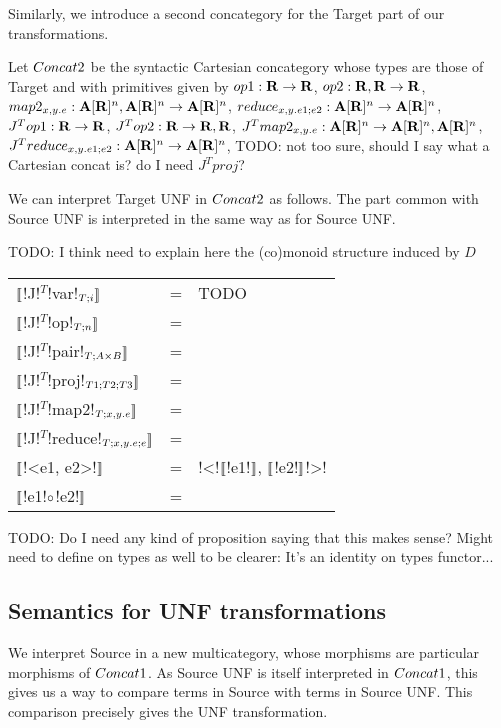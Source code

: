 Similarly, we introduce a second concategory for the Target part of our transformations.

\begin{definition}[$\ConcatT$]
Let $\ConcatT$ be the syntactic Cartesian concategory whose types are those of Target and 
with primitives given by 
$op1: \mathbf{R} \to \mathbf{R}$, 
$op2: \mathbf{R},\mathbf{R} \to \mathbf{R}$, 
$map2_{x,y.e}: \mathbf{A}[\mathbf{R}]^{n},\mathbf{A}[\mathbf{R}]^{n}\to \mathbf{A}[\mathbf{R}]^{n}$, 
$reduce_{x,y.e1;e2}: \mathbf{A}[\mathbf{R}]^{n} \to \mathbf{A}[\mathbf{R}]^{n}$, 
$J^Top1: \mathbf{R} \to \mathbf{R}$, 
$J^Top2: \mathbf{R} \to \mathbf{R}, \mathbf{R}$, 
$J^Tmap2_{x,y.e}: \mathbf{A}[\mathbf{R}]^{n} \to \mathbf{A}[\mathbf{R}]^{n}, \mathbf{A}[\mathbf{R}]^{n}$, 
$J^Treduce_{x,y.e1;e2}: \mathbf{A}[\mathbf{R}]^{n} \to \mathbf{A}[\mathbf{R}]^{n}$, 
TODO: not too sure, should I say what a Cartesian concat is? do I need $J^Tproj$?
\end{definition}

We can interpret Target UNF in $\ConcatT$ as follows. 
The part common with Source UNF is interpreted in the same way as for Source UNF.

TODO: I think need to explain here the (co)monoid structure induced by $D$

\begin{tabular}{l c l}
    $\llbracket$!J!$^T$!var!$_{T;i} \rrbracket$ &=& TODO \\
    $\llbracket$!J!$^T$!op!$_{T;n} \rrbracket$ &=&  \\
    $\llbracket$!J!$^T$!pair!$_{T;A\times B} \rrbracket$ &=& \\
    $\llbracket$!J!$^T$!proj!$_{T1;T2;T3} \rrbracket$ &=& \\
    $\llbracket$!J!$^T$!map2!$_{T;x,y.e}\rrbracket$  &=& \\
    $\llbracket$!J!$^T$!reduce!$_{T;x,y.e;e}\rrbracket$  &=& \\
    $\llbracket$!<e1, e2>!$\rrbracket$  &=& !<!$\llbracket$!e1!$\rrbracket$, $\llbracket$!e2!$\rrbracket$!>! \\
    $\llbracket$!e1!$\circ$!e2!$\rrbracket$ &=&  \\
 \end{tabular}
TODO: Do I need any kind of proposition saying that this makes sense?
Might need to define on types as well to be clearer: It's an identity on types functor...

\subsection{Semantics for UNF transformations} %
\label{sub:Semantics for UNF transformations}

We interpret Source in a new multicategory, 
whose morphisms are particular morphisms of $Concat1$.
As Source UNF is itself interpreted in $Concat1$, 
this gives us a way to compare terms in Source with terms in Source UNF.
This comparison precisely gives the UNF transformation.

